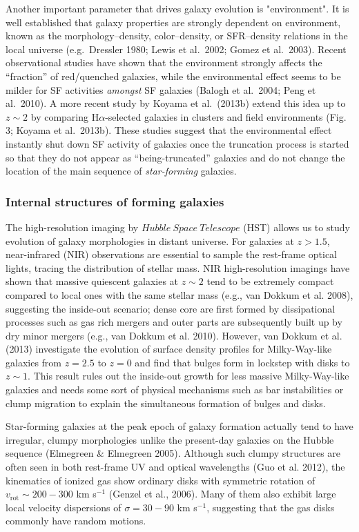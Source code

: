 Another important parameter that drives galaxy evolution is
"environment". It is well established that galaxy properties are
strongly dependent on environment, known as the morphology--density,
color--density, or SFR--density relations in the local universe (e.g.\
Dressler 1980; Lewis et al.\ 2002; Gomez et al.\ 2003). Recent
observational studies have shown that the environment strongly affects
the ``fraction'' of red/quenched galaxies, while the environmental
effect seems to be milder for SF activities {\it amongst} SF galaxies
(Balogh et al.\ 2004; Peng et al.\ 2010). A more recent study by Koyama
et al.\ (2013b) extend this idea up to $z\sim 2$ by comparing
H$\alpha$-selected galaxies in clusters and field environments
(Fig. 3; Koyama et al.\ 2013b).
These studies suggest that the environmental effect instantly shut down SF
activity of galaxies once the truncation process is started
so that they do not appear as ``being-truncated'' galaxies and do not change
the location of the main sequence of {\it star-forming} galaxies.

\subsubsection{Internal structures of forming galaxies}

The high-resolution imaging by $Hubble\ Space\ Telescope$ (HST) allows
us to study evolution of galaxy morphologies in distant universe.
For galaxies at $z>1.5$, near-infrared (NIR) observations are essential 
to sample the rest-frame optical lights, tracing the distribution of stellar mass. 
NIR high-resolution imagings have shown that massive quiescent galaxies 
at $z\sim2$ tend to be extremely compact compared to local ones with 
the same stellar mass (e.g., van Dokkum et al. 2008), suggesting 
the inside-out scenario; dense core are first formed by dissipational processes 
such as gas rich mergers and outer parts are subsequently built up by 
dry minor mergers (e.g., van Dokkum et al. 2010). However, van Dokkum et al. (2013) 
investigate the evolution of surface density profiles for Milky-Way-like galaxies 
from $z=2.5$ to $z=0$ and find that bulges form in lockstep with disks to 
$z\sim1$. This result rules out the inside-out
growth for less massive Milky-Way-like galaxies and needs some sort of physical
mechanisms such as bar instabilities or clump migration to explain the simultaneous
formation of bulges and disks.

Star-forming galaxies at the peak epoch of galaxy formation actually tend 
to have irregular, clumpy morphologies unlike the present-day galaxies 
on the Hubble sequence (Elmegreen \& Elmegreen 2005). Although such 
clumpy structures are often seen in both rest-frame UV and optical wavelengths 
(Guo et al. 2012), the kinematics of ionized gas show ordinary disks with 
symmetric rotation of $v_\mathrm{rot}\sim200-300$ km s$^{-1}$ 
(Genzel et al., 2006). Many of them also exhibit large local velocity dispersions
of $\sigma=30-90$ km s$^{-1}$, suggesting that the gas disks commonly have 
random motions.

